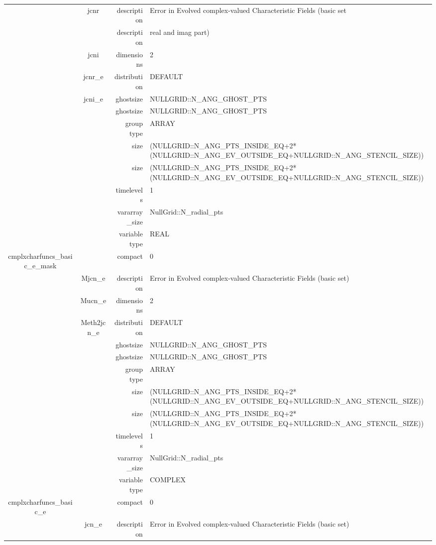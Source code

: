 \begin{tabular*}{150mm}{|c|c@{\extracolsep{\fill}}|rl|}
 & jcnr & description & Error in Evolved complex-valued Characteristic Fields (basic set \\ 
& ~ & description &  real and imag part) \\ 
 & jcni & dimensions & 2 \\ 
 & jcnr\_e & distribution & DEFAULT \\ 
 & jcni\_e & ghostsize & NULLGRID::N\_ANG\_GHOST\_PTS \\ 
& ~ & ghostsize & NULLGRID::N\_ANG\_GHOST\_PTS \\ 
 &  & group type & ARRAY \\ 
 &  & size & (NULLGRID::N\_ANG\_PTS\_INSIDE\_EQ+2*(NULLGRID::N\_ANG\_EV\_OUTSIDE\_EQ+NULLGRID::N\_ANG\_STENCIL\_SIZE)) \\ 
& ~ & size & (NULLGRID::N\_ANG\_PTS\_INSIDE\_EQ+2*(NULLGRID::N\_ANG\_EV\_OUTSIDE\_EQ+NULLGRID::N\_ANG\_STENCIL\_SIZE)) \\ 
 &  & timelevels & 1 \\ 
 &  & vararray\_size & NullGrid::N\_radial\_pts \\ 
 &  & variable type & REAL \\ 
\hline 
cmplxcharfuncs\_basic\_e\_mask &  & compact & 0 \\ 
 & Mjcn\_e & description & Error in Evolved complex-valued Characteristic Fields (basic set) \\ 
 & Mucn\_e & dimensions & 2 \\ 
 & Meth2jcn\_e & distribution & DEFAULT \\ 
 &  & ghostsize & NULLGRID::N\_ANG\_GHOST\_PTS \\ 
& ~ & ghostsize & NULLGRID::N\_ANG\_GHOST\_PTS \\ 
 &  & group type & ARRAY \\ 
 &  & size & (NULLGRID::N\_ANG\_PTS\_INSIDE\_EQ+2*(NULLGRID::N\_ANG\_EV\_OUTSIDE\_EQ+NULLGRID::N\_ANG\_STENCIL\_SIZE)) \\ 
& ~ & size & (NULLGRID::N\_ANG\_PTS\_INSIDE\_EQ+2*(NULLGRID::N\_ANG\_EV\_OUTSIDE\_EQ+NULLGRID::N\_ANG\_STENCIL\_SIZE)) \\ 
 &  & timelevels & 1 \\ 
 &  & vararray\_size & NullGrid::N\_radial\_pts \\ 
 &  & variable type & COMPLEX \\ 
\hline 
cmplxcharfuncs\_basic\_e &  & compact & 0 \\ 
 & jcn\_e & description & Error in Evolved complex-valued Characteristic Fields (basic set) \\ 

\end{tabular*}
